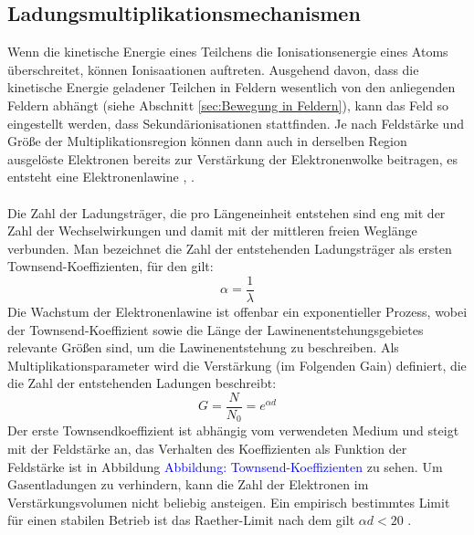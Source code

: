 		\subsection{Ladungsmultiplikationsmechanismen} \label{sec:Ladungsmultiplikation}
			Wenn die kinetische Energie eines Teilchens die Ionisationsenergie eines Atoms überschreitet, können Ionisaationen auftreten. Ausgehend davon, dass die kinetische Energie geladener Teilchen in Feldern wesentlich von den anliegenden Feldern abhängt (siehe Abschnitt \ref{sec:Bewegung in Feldern}), kann das Feld so eingestellt werden, dass Sekundärionisationen stattfinden. Je nach Feldstärke und Größe der Multiplikationsregion können dann auch in derselben Region ausgelöste Elektronen bereits zur Verstärkung der Elektronenwolke beitragen, es entsteht eine Elektronenlawine \cite{Townsend}, \cite{Leo}.\\
			\\
			Die Zahl der Ladungsträger, die pro Längeneinheit entstehen sind eng mit der Zahl der Wechselwirkungen und damit mit der mittleren freien Weglänge verbunden. Man bezeichnet die Zahl der entstehenden Ladungsträger als ersten Townsend-Koeffizienten, für den gilt:
			\begin{equation*}
				\alpha=\frac{1}{\lambda}
			\end{equation*}
			Die Wachstum der Elektronenlawine ist offenbar ein exponentieller Prozess, wobei der Townsend-Koeffizient sowie die Länge der Lawinenentstehungsgebietes relevante Größen sind, um die Lawinenentstehung zu beschreiben. Als Multiplikationsparameter wird die Verstärkung (im Folgenden Gain) definiert, die die Zahl der entstehenden Ladungen beschreibt:
			\begin{equation}
				G=\frac{N}{N_{0}} = e^{\alpha d}
			\end{equation}
			Der erste Townsendkoeffizient ist abhängig vom verwendeten Medium und steigt mit der Feldstärke an, das Verhalten des Koeffizienten als Funktion der Feldstärke ist in Abbildung  \textcolor{blue}{Abbildung: Townsend-Koeffizienten} zu sehen. Um Gasentladungen zu verhindern, kann die Zahl der Elektronen im Verstärkungsvolumen nicht beliebig ansteigen. Ein empirisch bestimmtes Limit für einen stabilen Betrieb ist das Raether-Limit nach dem gilt $\alpha d<20$ \cite{Sauli_Multiwire}.
			
			
			\newpage
